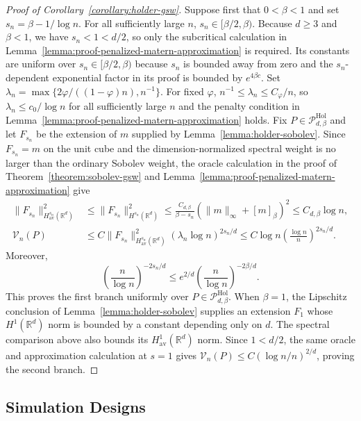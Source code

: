 \documentclass[letterpaper,12pt]{article}
\theoremstyle{definition}
\numberwithin{equation}{section}
\newcommand{\mr}{\mathbb{R}}
\newcommand{\mc}{\mathcal}
\newcommand{\norm}[1]{\lVert#1\rVert}
\begin{document}
\begin{proof}[Proof of Corollary~\ref{corollary:holder-gsw}]
Suppose first that $0<\beta<1$ and set $s_n=\beta-1/\log n$.
For all sufficiently large $n$, $s_n\in[\beta/2,\beta)$.
Because $d\geq3$ and $\beta<1$, we have $s_n<1<d/2$, so only the subcritical calculation in Lemma~\ref{lemma:proof-penalized-matern-approximation} is required.
Its constants are uniform over $s_n\in[\beta/2,\beta)$ because $s_n$ is bounded away from zero and the $s_n$-dependent exponential factor in its proof is bounded by $e^{4\beta c}$.
Set $\lambda_n=\max\{2\varphi/((1-\varphi)n),n^{-1}\}$.
For fixed $\varphi$, $n^{-1}\leq\lambda_n\leq C_\varphi/n$, so $\lambda_n\leq c_0/\log n$ for all sufficiently large $n$ and the penalty condition in Lemma~\ref{lemma:proof-penalized-matern-approximation} holds.
Fix $P\in\mc P_{d,\beta}^{\mathrm{Hol}}$ and let $F_{s_n}$ be the extension of $m$ supplied by Lemma~\ref{lemma:holder-sobolev}.
Since $F_{s_n}=m$ on the unit cube and the dimension-normalized spectral weight is no larger than the ordinary Sobolev weight, the oracle calculation in the proof of Theorem~\ref{theorem:sobolev-gsw} and Lemma~\ref{lemma:proof-penalized-matern-approximation} give
\begin{align*}
\norm{F_{s_n}}_{H_{\mathrm{av}}^{s_n}(\mr^d)}^2&\leq\norm{F_{s_n}}_{H^{s_n}(\mr^d)}^2\leq\frac{C_{d,\beta}}{\beta-s_n}(\norm{m}_\infty+[m]_\beta)^2\leq C_{d,\beta}\log n,\\
\mc V_n(P)&\leq C\norm{F_{s_n}}_{H_{\mathrm{av}}^{s_n}(\mr^d)}^2(\lambda_n\log n)^{2s_n/d}\leq C\log n\left(\frac{\log n}{n}\right)^{2s_n/d}.
\end{align*}
Moreover,
\begin{equation}\label{equation:moving-holder-exponent}
\left(\frac n{\log n}\right)^{-2s_n/d} \leq e^{2/d}\left(\frac n{\log n}\right)^{-2\beta/d}.
\end{equation}
This proves the first branch uniformly over $P\in\mc P_{d,\beta}^{\mathrm{Hol}}$.
When $\beta=1$, the Lipschitz conclusion of Lemma~\ref{lemma:holder-sobolev} supplies an extension $F_1$ whose $H^1(\mr^d)$ norm is bounded by a constant depending only on $d$.
The spectral comparison above also bounds its $H_{\mathrm{av}}^1(\mr^d)$ norm.
Since $1<d/2$, the same oracle and approximation calculation at $s=1$ gives $\mc V_n(P)\leq C(\log n/n)^{2/d}$, proving the second branch.
\end{proof}


\subsection{Simulation Designs}\label{appendix:simulation-designs}
\end{document}
